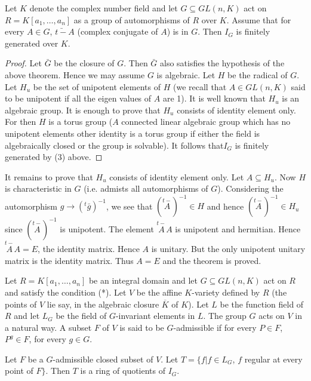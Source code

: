 \begin{thm}%
  Let $K$ denote the complex
  number field and let $G \subseteq GL(n, K)$ act on $R = K [a_1,
    \ldots ,a_n]$ as a group of automorphisms of $R$ over $K$. Assume
  that for every  $A \in G$, $\bar{t-}{A}$ (complex conjugate of $A$)
  is in $G$. Then $I_G$ is finitely generated over $K$.   
 \end{thm}

\begin{proof}
 Let $\bar{G}$  be the closure of $G$. Then $\bar{G}$ also satisfies
 the hypothesis of the above theorem. Hence we may assume $G$ is
 algebraic. Let $H$ be the radical of $G$. Let $H_u$ be the set of
 unipotent elements of $H$ (we recall that $A \in GL(n, K)$ said to be
 unipotent if all the eigen values of $A$ are 1). It is well known
 that $H_u$ is an algebraic group. It is enough to prove that $H_u$
 consists of identity element only. For then $H$ is a torus group ($A$
 connected linear algebraic group which has no unipotent elements
 other identity is a torus group if either the field is algebraically
 closed or the group is solvable). It follows that\pageoriginale $I_G$
 is finitely generated by (3) above.  
\end{proof}

It remains to prove that $H_u$ consists of identity element only.  
Let $A \subseteq H_u$. Now $H$ is characteristic in $G$ (i.e. admists all
automorphisms of $G$). Considering the automorphism $g \rightarrow
({}^t \bar{g})^{-1}$,  we see that $ (\overset{t-}{A})^{-1}  \in
H$ and hence $  (\overset{t-}{A})^{-1} \in H_u $ since $
(\overset{t-}{A})^{-1} $ is unipotent. The element $  \overset{t-}{A}
A$ is unipotent and hermitian. Hence $\overset{t-}{A} A = E$, the
identity matrix. Hence $A$ is unitary. But the only unipotent unitary
matrix is the identity matrix. Thus $A = E$ and the theorem is
proved. 

\medskip
{}
\quad Let $R = K [a_1, \ldots , a_n]$ be an integral domain and let $G
\subseteq GL (n, K)$ act on $R$ and satisfy the condition (*). Let $V$  be
the affine $K$-variety defined by $R$ (the points of $V$ lie say, in
the algebraic closure $  \overline{K}$ of $K$). Let $L$ be the
function field of $R$ and let $L_G $ be the field of $G$-invariant
elements in $L$. The group $G$ acts on $V$ in a natural way. A subset
$F$ of $V$ is said to be $G$-admissible if for every $P \in F$, $P^{g}
\in F$, for every $g \in G$.  

\begin{thm}\label{chap2:thm3}%
 Let $F$ be a $G$-admissible closed subset of $V$. Let $T = \bigg\{f
 \bigg| f \in L_G$, $f$ regular at every point of $F \bigg\}$. Then
 $T$ is a ring of quotients of $I_G$. 
 \end{thm}

